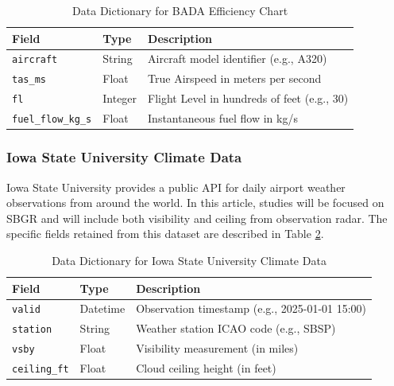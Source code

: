 \begin{table}[htbp]
\caption{Data Dictionary for BADA Efficiency Chart}
\label{tab:bada_dict}
\centering
\begin{tabular}{m{} m{} m{}}
\hline
\textbf{Field} & \textbf{Type} & \textbf{Description} \\
\hline
\texttt{aircraft} & String & Aircraft model identifier (e.g., A320) \\
\texttt{tas\_ms} & Float & True Airspeed in meters per second \\
\texttt{fl} & Integer & Flight Level in hundreds of feet (e.g., 30) \\
\texttt{fuel\_flow\_kg\_s} & Float & Instantaneous fuel flow in kg/s \\
\hline
\end{tabular}
\end{table}

\subsubsection{Iowa State University Climate Data}
Iowa State University provides a public API for daily airport weather observations from around the world. In this article, studies will be focused on SBGR and will include both visibility and ceiling from observation radar. The specific fields retained from this dataset are described in Table \ref{tab:climate_dict}.

\begin{table}[htbp]
\caption{Data Dictionary for Iowa State University Climate Data}
\label{tab:climate_dict}
\centering
\begin{tabular}{m{} m{} m{}}
\hline
\textbf{Field} & \textbf{Type} & \textbf{Description} \\
\hline
\texttt{valid} & Datetime & Observation timestamp (e.g., 2025-01-01 15:00) \\
\texttt{station} & String & Weather station ICAO code (e.g., SBSP) \\
\texttt{vsby} & Float & Visibility measurement (in miles) \\
\texttt{ceiling\_ft} & Float & Cloud ceiling height (in feet) \\
\hline
\end{tabular}
\end{table}

